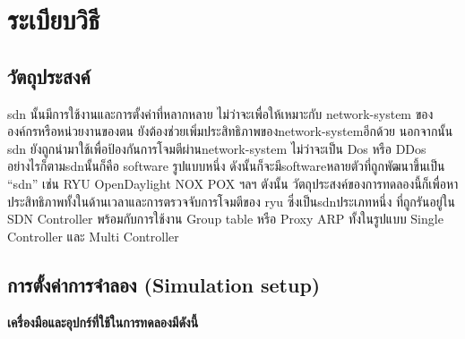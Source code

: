 \section{ระเบียบวิธี} 

\subsection{วัตถุประสงค์}  
\indent\indent
\gls{sdn} นั้นมีการใช้งานและการตั้งค่าที่หลากหลาย
ไม่ว่าจะเพื่อให้เหมาะกับ \gls{network-system} ขององค์กรหรือหน่วยงานของตน ยังต้องช่วยเพิ่มประสิทธิภาพของ\gls{network-system}อีกด้วย
นอกจากนั้น \gls{sdn} ยังถูกนำมาใช้เพื่อป้องกันการโจมตีผ่าน\gls{network-system} ไม่ว่าจะเป็น Dos หรือ DDos
อย่างไรก็ตาม\gls{sdn}นั้นก็คือ \gls{software} รูปแบบหนึ่ง
ดังนั้นก็จะมี\gls{software}หลายตัวที่ถูกพัฒนาขึ้นเป็น ``\gls{sdn}'' เช่น RYU OpenDaylight NOX POX ฯลฯ 
ตังนั้น
วัตถุประสงค์ของการทดลองนี้ก็เพื่อหาประสิทธิภาพทั้งในด้านเวลาและการตรวจจับการโจมตีของ \gls{ryu} ซึ่งเป็น\gls{sdn}ประเภทหนึ่ง ที่ถูกรันอยู่ใน SDN Controller
พร้อมกับการใช้งาน Group table หรือ Proxy ARP ทั้งในรูปแบบ Single Controller และ Multi Controller 
\\
\subsection{การตั้งค่าการจำลอง (Simulation setup)}

\textbf{เครื่องมือและอุปกร์ที่ใช้ในการทดลองมีดังนี้} 

